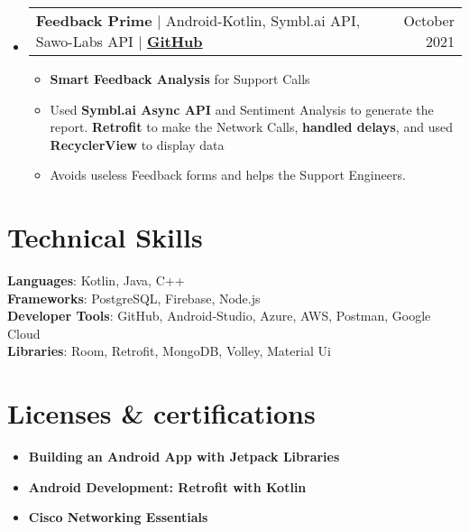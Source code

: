 \documentclass[letterpaper,11pt]{article}
\makeatletter
\newcommand{\resumeItem}[1]{
  \item\small{
    {#1 \vspace{-2pt}}
  }
}
\newcommand{\resumeProjectHeading}[2]{
    \item
    \begin{tabular*}{0.97\textwidth}{l@{\extracolsep{\fill}}r}
      \small#1 & #2 \\
    \end{tabular*}\vspace{-7pt}
}
\newcommand{\resumeSubHeadingListStart}{\begin{itemize}[leftmargin=0.15in, label={}]}
\newcommand{\resumeSubHeadingListEnd}{\end{itemize}}
\newcommand{\resumeItemListStart}{\begin{itemize}}
\newcommand{\resumeItemListEnd}{\end{itemize}\vspace{-5pt}}
\makeatother
\begin{document}
    \resumeSubHeadingListStart
      \resumeProjectHeading
          {\textbf{Feedback Prime }$|${ Android-Kotlin, Symbl.ai API, Sawo-Labs API } $|$ \textbf{\href{https://github.com/aniketk13/Feedback-Prime}{GitHub}}}{October 2021}
          \resumeItemListStart
           \resumeItem{\textbf{Smart Feedback Analysis} for Support Calls}
           \resumeItem{Used \textbf{Symbl.ai Async API} and Sentiment Analysis to generate the report. \textbf{Retrofit} to make the Network Calls, \textbf{handled delays}, and used \textbf{RecyclerView} to display data }
           \resumeItem{Avoids useless Feedback forms and helps the Support Engineers.}
          \resumeItemListEnd
    \resumeSubHeadingListEnd
\section{\textbf{Technical Skills}}
 \begin{itemize}[leftmargin=0.15in, label={}]
    \small{\item{
     \textbf{Languages}{: Kotlin, Java, C++} \\
     \textbf{Frameworks}{: PostgreSQL, Firebase, Node.js } \\
     \textbf{Developer Tools}{: GitHub, Android-Studio, Azure, AWS, Postman, Google Cloud} \\
     \textbf{Libraries}{: Room, Retrofit, MongoDB, Volley, Material Ui  }
    }} 
 \end{itemize}
   
\section{\textbf{Licenses \& certifications}}
 \begin{itemize}[leftmargin=0.15in, label={}]
    \small{\item{
        \resumeItemListStart
                \resumeItem{\textbf{{Building an Android App with Jetpack Libraries}}}
                \resumeItem{\textbf{{Android Development: Retrofit with Kotlin}}} 

                \resumeItem{\textbf{{Cisco Networking Essentials}}} 
      \resumeItemListEnd
    }}
 \end{itemize}
    
\end{document}
